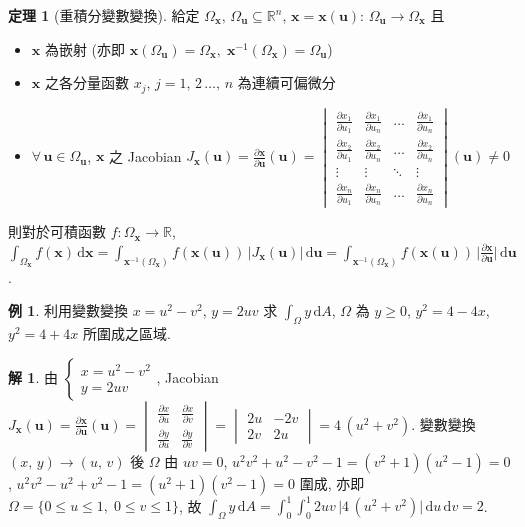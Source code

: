 \documentclass[12pt]{extarticle}
\newcommand{\ds}{\displaystyle}
\theoremstyle{definition}
\newtheorem*{thm}{定理}
\newtheorem*{ex}{例}
\newtheorem*{sol}{解}
\newcommand{\vu}{\mathbf{u}}
\newcommand{\vx}{\mathbf{x}}
\begin{document}
\begin{thm}[重積分變數變換]
  給定 $\Omega_{\vx},\,\Omega_{\vu}\subseteq\mathbb{R}^n$, $\ds\vx = \vx(\vu):\,\Omega_{\vu}\to\Omega_{\vx}$ 且 
  \begin{itemize}
    \item $\vx$ 為嵌射 (亦即 $\ds\vx(\Omega_{\vu}) = \Omega_{\vx},\;\vx^{-1}(\Omega_{\vx}) = \Omega_{\vu}$)
    \item $\vx$ 之各分量函數 $x_j$, $j = 1,\,2\,\ldots,\,n$ 為連續可偏微分
    \item $\forall\,\vu\in\Omega_{\vu}$, $\vx$ 之 Jacobian $\ds J_{\vx}(\vu) = \frac{\partial\vx}{\partial\vu}(\vu) = \begin{vmatrix}\frac{\partial x_1}{\partial u_1} & \frac{\partial x_1}{\partial u_n} & \ldots &\frac{\partial x_1}{\partial u_n} \\ \frac{\partial x_2}{\partial u_1}& \frac{\partial x_2}{\partial u_n} & \ldots &\frac{\partial x_2}{\partial u_n} \\ \vdots & \vdots & \ddots & \vdots \\ \frac{\partial x_n}{\partial u_1} & \frac{\partial x_n}{\partial u_n} & \ldots &\frac{\partial x_n}{\partial u_n} \end{vmatrix}(\vu)\ne 0$
  \end{itemize}
  則對於可積函數 $f:\Omega_{\vx}\to\mathbb{R}$, $\ds\int_{\Omega_{\vx}} f(\vx)\,\text{d}\vx = \int_{\vx^{-1}(\Omega_{\vx})}\!\!\!\!f(\vx(\vu))\,\big|J_{\vx}(\vu)\big|\,\text{d}\vu = \int_{\vx^{-1}(\Omega_{\vx})}\!\!\!\!f(\vx(\vu))\,\bigg|\frac{\partial\vx}{\partial\vu}\bigg|\,\text{d}\vu$.
\end{thm}

\begin{ex}
  利用變數變換 $x = u^2 - v^2$, $y = 2uv$ 求 $\ds\int_\Omega\!y\,\text{d}A$, $\Omega$ 為 $y \geqslant 0$, $y^2 = 4 - 4x$, $y^2 = 4  + 4x$ 所圍成之區域. 
\end{ex}

\begin{sol}
  由 $\ds\begin{cases}x = u^2 - v^2 \\ y = 2uv\end{cases}\!\!\!\!\!$, Jacobian $\ds J_{\vx}(\vu) = \frac{\partial\vx}{\partial\vu}(\vu) = \begin{vmatrix}\frac{\partial x}{\partial u} & \frac{\partial x}{\partial v} \\ \frac{\partial y}{\partial u}& \frac{\partial y}{\partial v}\end{vmatrix} = \begin{vmatrix}2u & -2v\\ 2v & 2u\end{vmatrix} = 4\,(u^2 + v^2)$. 變數變換 $(x,\,y)\to(u,\,v)$ 後 $\Omega$ 由 $uv = 0$, $u^2v^2 + u^2 - v^2 - 1 = (v^2 + 1)(u^2 - 1) = 0$, $u^2v^2 - u^2 + v^2 - 1 = (u^2 + 1)(v^2 - 1) = 0$ 圍成, 亦即 $\Omega = \{0\leqslant u\leqslant 1,\;0\leqslant v\leqslant 1\}$, 故 $\ds\int_\Omega\!y\,\text{d}A = \int_0^1\!\int_0^1 2uv\,\Big|4\,(u^2 + v^2)\Big|\,\text{d}u\,\text{d}v = 2$.
\end{sol}
\end{document}
